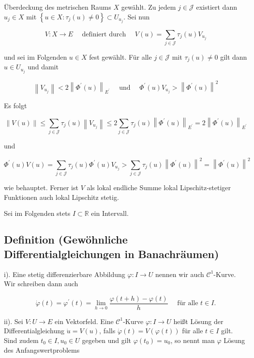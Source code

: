 \documentclass[10pt, letterpaper]{article}
\begin{document}
Überdeckung des metrischen Raums $X$ gewählt. Zu jedem $j \in \mathcal{J}$ existiert dann $u_{j} \in X$ mit $\left\{u \in X: \tau_{j}(u) \neq 0\right\} \subset U_{u_{j}}$. Sei nun

$$
V: X \rightarrow E \quad \text { definiert durch } \quad V(u)=\sum_{j \in \mathcal{J}} \tau_{j}(u) V_{u_{j}}
$$

und sei im Folgenden $u \in X$ fest gewählt. Für alle $j \in \mathcal{J}$ mit $\tau_{j}(u) \neq 0$ gilt dann $u \in U_{u_{j}}$ und damit

$$
\left\|V_{u_{j}}\right\|<2\left\|\Phi^{\prime}(u)\right\|_{E^{\prime}} \quad \text { und } \quad \Phi^{\prime}(u) V_{u_{j}}>\left\|\Phi^{\prime}(u)\right\|^{2}
$$

Es folgt

$$
\|V(u)\| \leq \sum_{j \in \mathcal{J}} \tau_{j}(u)\left\|V_{u_{j}}\right\| \leq 2 \sum_{j \in \mathcal{J}} \tau_{j}(u)\left\|\Phi^{\prime}(u)\right\|_{E^{\prime}}=2\left\|\Phi^{\prime}(u)\right\|_{E^{\prime}}
$$

und

$$
\Phi^{\prime}(u) V(u)=\sum_{j \in \mathcal{J}} \tau_{j}(u) \Phi^{\prime}(u) V_{u_{j}}>\sum_{j \in \mathcal{J}} \tau_{j}(u)\left\|\Phi^{\prime}(u)\right\|^{2}=\left\|\Phi^{\prime}(u)\right\|^{2}
$$

wie behauptet. Ferner ist $V$ als lokal endliche Summe lokal Lipschitz-stetiger Funktionen auch lokal Lipschitz stetig.

Sei im Folgenden stets $I \subset \mathbb{R}$ ein Intervall.

\subsection*{Definition (Gewöhnliche Differentialgleichungen in Banachräumen)}

i). Eine stetig differenzierbare Abbildung $\varphi: I \rightarrow U$ nennen wir auch $\mathcal{C}^{1}$-Kurve. Wir schreiben dann auch

$$
\dot{\varphi}(t)=\varphi^{\prime}(t)=\lim _{h \rightarrow 0} \frac{\varphi(t+h)-\varphi(t)}{h} \quad \text { für alle } t \in I .
$$

ii). Sei $V: U \rightarrow E$ ein Vektorfeld. Eine $\mathcal{C}^{1}$-Kurve $\varphi: I \rightarrow U$ heißt Lösung der Differentialgleichung $\dot{u}=V(u)$, falls $\dot{\varphi}(t)=V(\varphi(t))$ für alle $t \in I$ gilt. Sind zudem $t_{0} \in I, u_{0} \in U$ gegeben und gilt $\varphi\left(t_{0}\right)=u_{0}$, so nennt man $\varphi$ Lösung des Anfangswertproblems
\end{document}

